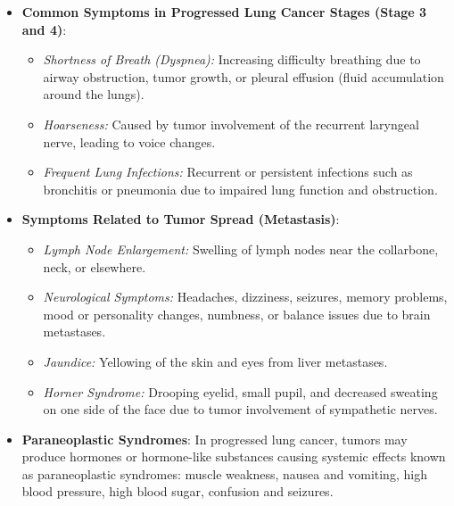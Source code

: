 \newpage
\begin{itemize}
    \item \textbf{Common Symptoms in Progressed Lung Cancer Stages (Stage 3 and 4)}:
        \begin{itemize}
            \item \textit{Shortness of Breath (Dyspnea):} Increasing difficulty breathing due to 
            airway obstruction, tumor growth, or pleural effusion (fluid accumulation around the 
            lungs).
            \item \textit{Hoarseness:} Caused by tumor involvement of the recurrent laryngeal nerve, 
            leading to voice changes.
            \item \textit{Frequent Lung Infections:} Recurrent or persistent infections such as 
            bronchitis or pneumonia due to impaired lung function and obstruction.
        \end{itemize}
    \item \textbf{Symptoms Related to Tumor Spread (Metastasis)}:
        \begin{itemize}
            \item \textit{Lymph Node Enlargement:} Swelling of lymph nodes near the collarbone, 
            neck, or elsewhere.
            \item \textit{Neurological Symptoms:} Headaches, dizziness, seizures, memory problems, 
            mood or personality changes, numbness, or balance issues due to brain metastases.
            \item \textit{Jaundice:} Yellowing of the skin and eyes from liver metastases.
            \item \textit{Horner Syndrome:} Drooping eyelid, small pupil, and decreased sweating on 
            one side of the face due to tumor involvement of sympathetic nerves.
        \end{itemize}
    \item \textbf{Paraneoplastic Syndromes}:
    In progressed lung cancer, tumors may produce hormones or hormone-like substances causing 
    systemic effects known as paraneoplastic syndromes: muscle weakness, nausea and vomiting, high 
    blood pressure, high blood sugar, confusion and seizures.  
\end{itemize}
